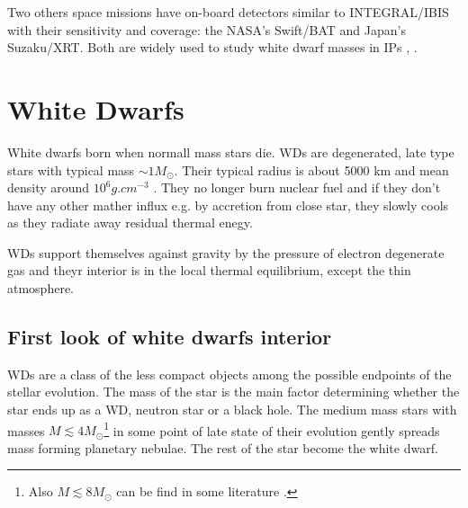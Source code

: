 \documentclass[oneside,a4paper,11pt]{report}
\begin{document}
Two others space missions have on-board detectors similar to INTEGRAL/IBIS with their sensitivity 
and coverage: the NASA's Swift/BAT and Japan's Suzaku/XRT. Both are widely used to study white dwarf 
masses in IPs \citet{2009A&A...496..121B}, \citet{2010A&A...520A..25Y}.    



\chapter{White Dwarfs}
White dwarfs born when normall mass stars die. WDs are degenerated, late type stars with typical mass $\sim 1 M_{\odot}$. Their typical radius is about
 5000 km and mean density around $10^6 g.cm^{-3}$ \citet{2004bhwd.book.....S}. They no longer burn nuclear fuel and
if they don't have any other mather influx e.g. by accretion from close star, they slowly cools as they radiate
away residual thermal enegy.

WDs support themselves against gravity by the pressure of electron degenerate gas and theyr interior is in the local thermal 
equilibrium, except the thin atmosphere.  
 


\section{First look of white dwarfs interior}
WDs are a class of the less compact objects among the possible endpoints of the stellar evolution. 
The mass of the star is the main factor determining whether the star ends up as a WD, neutron star or a black hole.
The medium mass stars with masses $M \lesssim  4M_{\odot}$\footnote{Also $M \lesssim  8M_{\odot}$ can be find in 
some literature \citet{padm_vII}.} in some point of late state of their evolution gently spreads mass
 forming planetary nebulae. The rest of the star become the white dwarf.  
\end{document}

